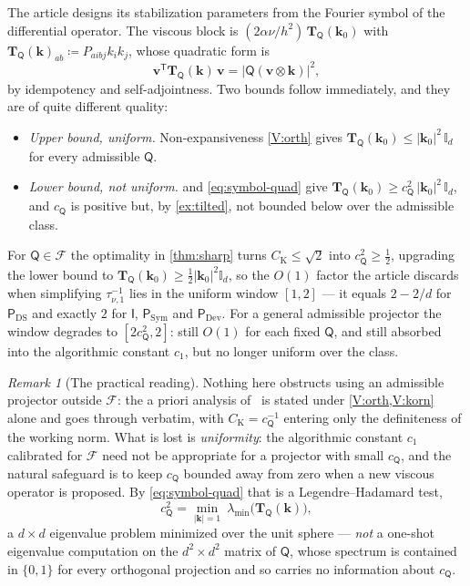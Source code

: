 \documentclass[11pt]{article}
\theoremstyle{plain}
\theoremstyle{definition}
\theoremstyle{remark}
\newtheorem{remark}[theorem]{Remark}
\newcommand{\IPi}{\mathsf{I}}
\newcommand{\AnyProj}{\mathsf{Q}}
\newcommand{\DSPi}{\mathsf{P}_{\mathrm{DS}}}
\newcommand{\DPi}{\mathsf{P}_{\mathrm{Dev}}}
\newcommand{\SPi}{\mathsf{P}_{\mathrm{Sym}}}
\newcommand{\bv}{\boldsymbol{v}}
\newcommand{\bk}{\boldsymbol{k}}
\newcommand{\CK}{C_{\mathrm{K}}}
\newcommand{\cP}{c_{\AnyProj}}
\begin{document}
The article designs its stabilization parameters from the Fourier symbol of the differential
operator. The viscous block is $(2\alpha\nu/h^2)\,\mathbf{T}_{\AnyProj}(\bk_0)$ with
$\mathbf{T}_{\AnyProj}(\bk)_{ab}\coloneqq P_{aibj}k_ik_j$, whose quadratic form is
\begin{equation}\label{eq:symbol-quad}
  \bv^{\mathsf T}\mathbf{T}_{\AnyProj}(\bk)\,\bv=\bigl|\AnyProj(\bv\otimes\bk)\bigr|^2 ,
\end{equation}
by idempotency and self{-}adjointness. Two bounds follow immediately, and they are of quite
different quality:
\begin{itemize}[leftmargin=1.6em]
  \item \emph{Upper bound, uniform.} Non{-}expansiveness \cref{V:orth} gives
  $\mathbf{T}_{\AnyProj}(\bk_0)\le|\bk_0|^2\,\mathbb{I}_d$ for every admissible $\AnyProj$.
  \item \emph{Lower bound, not uniform.}  and \cref{eq:symbol-quad} give
  $\mathbf{T}_{\AnyProj}(\bk_0)\ge\cP^2\,|\bk_0|^2\,\mathbb{I}_d$, and $\cP$ is positive but,
  by \cref{ex:tilted}, not bounded below over the admissible class.
\end{itemize}
For $\AnyProj\in\mathcal{F}$ the optimality in \cref{thm:sharp} turns $\CK\le\sqrt2$ into
$\cP^2\ge\tfrac12$, upgrading the lower bound to
$\mathbf{T}_{\AnyProj}(\bk_0)\ge\tfrac12|\bk_0|^2\mathbb{I}_d$, so the $O(1)$ factor the article
discards when simplifying $\tau_{\nu,1}^{-1}$ lies in the uniform window $[1,2]$ --- it equals
$2-2/d$ for $\DSPi$ and exactly $2$ for $\IPi$, $\SPi$ and $\DPi$. For a general
admissible projector the window degrades to $[2\cP^2,2]$: still $O(1)$ for each fixed $\AnyProj$,
and still absorbed into the algorithmic constant $c_1$, but no longer uniform over the class.

\begin{remark}[The practical reading]\label{rem:practical}
Nothing here obstructs using an admissible projector outside $\mathcal{F}$: the a priori
analysis of~\cite{paper} is stated under \cref{V:orth,V:korn} alone and goes through verbatim,
with $\CK=\cP^{-1}$ entering only the definiteness of the working norm. What is lost is
\emph{uniformity}: the algorithmic constant $c_1$ calibrated for $\mathcal{F}$ need not be
appropriate for a projector with small $\cP$, and the natural safeguard is to keep
$\cP$ bounded away from zero when a new viscous operator is proposed. By
\cref{eq:symbol-quad} that is a Legendre--Hadamard test,
\begin{equation}\label{eq:cPi-recipe}
  \cP^2=\min_{|\bk|=1}\ \lambda_{\min}\bigl(\mathbf{T}_{\AnyProj}(\bk)\bigr),
\end{equation}
a $d\times d$ eigenvalue problem minimized over the unit sphere --- \emph{not} a one-shot
eigenvalue computation on the $d^2\times d^2$ matrix of $\AnyProj$, whose spectrum is contained
in $\{0,1\}$ for every orthogonal projection and so carries no information about $\cP$.
\end{remark}
\end{document}
